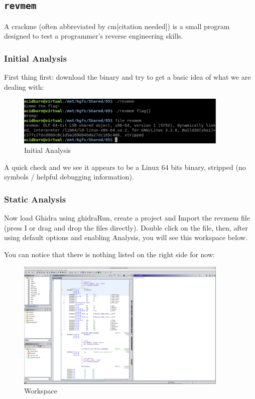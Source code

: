 \documentclass{article}
\begin{document}
\subsection{\texttt{revmem}}

A crackme (often abbreviated by cm[citation needed]) is a small program designed to test a programmer’s 
reverse engineering skills.

\subsubsection{Initial Analysis}

First thing first: download the binary and try to get a basic idea of what we are dealing with:
\begin{figure}[H]
\centering
\includegraphics[width=0.9\textwidth]{img/initial.jpg}
\caption{Initial Analysis}
\label{fig:initial}
\end{figure}
\noindent\linebreak
A quick check and we see it appears to be a Linux 64 bits binary, stripped (no symbols / helpful debugging information).

\subsubsection{Static Analysis}

\noindent\linebreak
Now load Ghidra using ghidraRun, create a project and Import the revmem file (press I or drag and drop the files 
directly). Double click on the file, then, after using default options and enabling Analysis, you will see this 
workspace below.

\noindent\linebreak
You can notice that there is nothing listed on the right side for now:
\begin{figure}[H]
\centering
\includegraphics[width=0.9\textwidth]{img/ghidra_1.jpg}
\caption{Workspace}
\label{fig:ghidra_1}
\end{figure}
\end{document}
